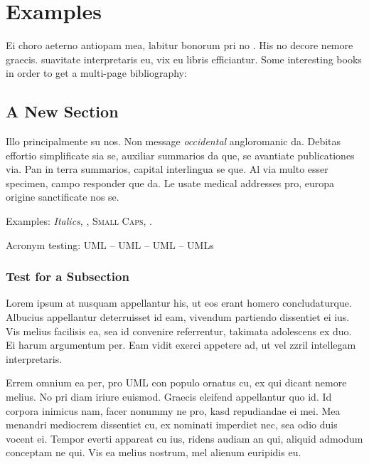 \chapter{Examples}\label{ch:examples}
Ei choro aeterno antiopam mea, labitur bonorum pri no
\citeauthor{taleb:2012} \citep{taleb:2012}. His no decore
nemore graecis. %
suavitate interpretaris eu, vix eu libris efficiantur.
 Some interesting books in order to get a multi-page bibliography: \cite{ferriss:2016,greenwald:2014,adams:2013,pausch:2008,aurelius:2002,adams:1996,trump:1987,feynman:1985,cialdini:1984,seneca,orwell:1949,taleb:2010,munger:2008,postman:2005,frankl:1959} %

\section{A New Section}
Illo principalmente su nos. Non message \emph{occidental} angloromanic
da. Debitas effortio simplificate sia se, auxiliar summarios da que,
se avantiate publicationes via. Pan in terra summarios, capital
interlingua se que. Al via multo esser specimen, campo responder que
da. Le usate medical addresses pro, europa origine sanctificate nos
se.

Examples: \textit{Italics}, , \textsc{Small
Caps}, .

Acronym testing: \ac{UML} -- \acs{UML} -- \acf{UML} -- \acp{UML}


\subsection{Test for a Subsection}
Lorem ipsum at nusquam appellantur his, ut eos erant homero
concludaturque. Albucius appellantur deterruisset id eam, vivendum
partiendo dissentiet ei ius. Vis melius facilisis ea, sea id convenire
referrentur, takimata adolescens ex duo. Ei harum argumentum per. Eam
vidit exerci appetere ad, ut vel zzril intellegam interpretaris.

Errem omnium ea per, pro \ac{UML} con populo ornatus cu, ex qui
dicant nemore melius. No pri diam iriure euismod. Graecis eleifend
appellantur quo id. Id corpora inimicus nam, facer nonummy ne pro,
kasd repudiandae ei mei. Mea menandri mediocrem dissentiet cu, ex
nominati imperdiet nec, sea odio duis vocent ei. Tempor everti
appareat cu ius, ridens audiam an qui, aliquid admodum conceptam ne
qui. Vis ea melius nostrum, mel alienum euripidis eu.

